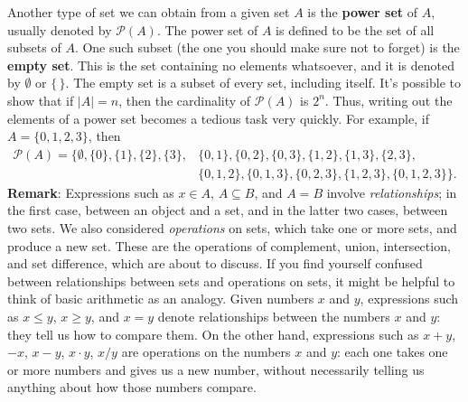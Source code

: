 \documentclass[letterpaper,12pt]{article}
\begin{document}
Another type of set we can obtain from a given set $A$ is the {\bf power set} of $A$, usually denoted by $\mathcal{P}(A)$. The power set of $A$ is defined to be the set of all subsets of $A$. One such subset (the one you should make sure not to forget) is the {\bf empty set}. This is the set containing no elements whatsoever, and it is denoted by $\emptyset$ or $\{\, \}$. The empty set is a subset of every set, including itself. It's possible to show that if $\lvert A\rvert = n$, then the cardinality of $\mathcal{P}(A)$ is $2^n$. Thus, writing out the elements of a power set becomes a tedious task very quickly. For example, if $A = \{0,1,2,3\}$, then
\begin{align*}
\mathcal{P}(A) = \{\emptyset,\{0\},\{1\},\{2\},\{3\},&\{0,1\},\{0,2\},\{0,3\},\{1,2\},\{1,3\},\{2,3\},\\
&\{0,1,2\},\{0,1,3\},\{0,2,3\},\{1,2,3\},\{0,1,2,3\}\}.
\end{align*}
{\bf Remark}: Expressions such as $x\in A$, $A\subseteq B$, and $A=B$ involve {\em relationships}; in the first case, between an object and a set, and in the latter two cases, between two sets. We also considered {\em operations} on sets, which take one or more sets, and produce a new set. These are the operations of complement, union, intersection, and set difference, which are about to discuss. If you find yourself confused between relationships between sets and operations on sets, it might be helpful to think of basic arithmetic as an analogy. Given numbers $x$ and $y$, expressions such as $x\leq y$, $x\geq y$, and $x=y$ denote relationships between the numbers $x$ and $y$: they tell us how to compare them. On the other hand, expressions such as $x+y$, $-x$, $x-y$, $x\cdot y$, $x/y$ are operations on the numbers $x$ and $y$: each one takes one or more numbers and gives us a new number, without necessarily telling us anything about how those numbers compare.
\end{document}
